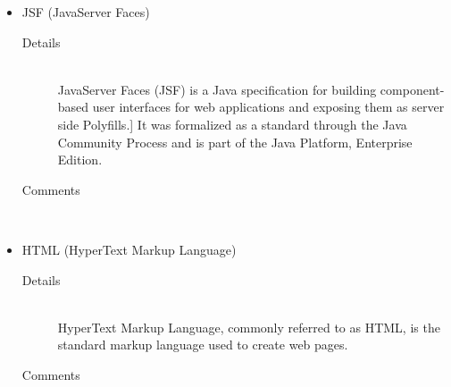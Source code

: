 \documentclass[10pt]{article}
\begin{document}
\begin{description}
\begin{itemize}
\begin{description}
					\end{description}
				\item JSF (JavaServer Faces)
					\begin{description}
						\item[Details] \hfill \\
							JavaServer Faces (JSF) is a Java specification for building component-based user interfaces for web applications and
							 exposing them as server side Polyfills.] It was formalized as a standard through the Java Community Process and is
							 part of the Java Platform, Enterprise Edition.
						\item[Comments]\hfill \\	
					\end{description}
				\item HTML (HyperText Markup Language)
					\begin{description}
						\item[Details] \hfill \\
							HyperText Markup Language, commonly referred to as HTML, is the standard markup language used to create web pages.
						\item[Comments]\hfill \\
							

\end{description}
\end{itemize}
\end{description}
\end{document}
